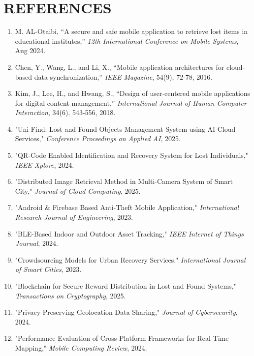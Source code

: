 \documentclass[12pt,a4paper]{report}
\begin{document}

\setlength{\parskip}{1em}
\renewcommand{\baselinestretch}{1.5}

\chapter*{REFERENCES}
{}

\begin{enumerate}

\item M. AL-Otaibi, “A secure and safe mobile application to retrieve lost items in educational institutes,” \textit{12th International Conference on Mobile Systems}, Aug 2024.
\item Chen, Y., Wang, L., and Li, X., “Mobile application architectures for cloud-based data synchronization,” \textit{IEEE Magazine}, 54(9), 72-78, 2016.
\item Kim, J., Lee, H., and Hwang, S., “Design of user-centered mobile applications for digital content management,” \textit{International Journal of Human-Computer Interaction}, 34(6), 543-556, 2018.
\item "Uni Find: Lost and Found Objects Management System using AI Cloud Services," \textit{Conference Proceedings on Applied AI}, 2025.
\item "QR-Code Enabled Identification and Recovery System for Lost Individuals," \textit{IEEE Xplore}, 2024.
\item "Distributed Image Retrieval Method in Multi-Camera System of Smart City," \textit{Journal of Cloud Computing}, 2025.
\item "Android \& Firebase Based Anti-Theft Mobile Application," \textit{International Research Journal of Engineering}, 2023.
\item "BLE-Based Indoor and Outdoor Asset Tracking," \textit{IEEE Internet of Things Journal}, 2024.
\item "Crowdsourcing Models for Urban Recovery Services," \textit{International Journal of Smart Cities}, 2023.
\item "Blockchain for Secure Reward Distribution in Lost and Found Systems," \textit{Transactions on Cryptography}, 2025.
\item "Privacy-Preserving Geolocation Data Sharing," \textit{Journal of Cybersecurity}, 2024.
\item "Performance Evaluation of Cross-Platform Frameworks for Real-Time Mapping," \textit{Mobile Computing Review}, 2024.
\end{enumerate}
\end{document}
